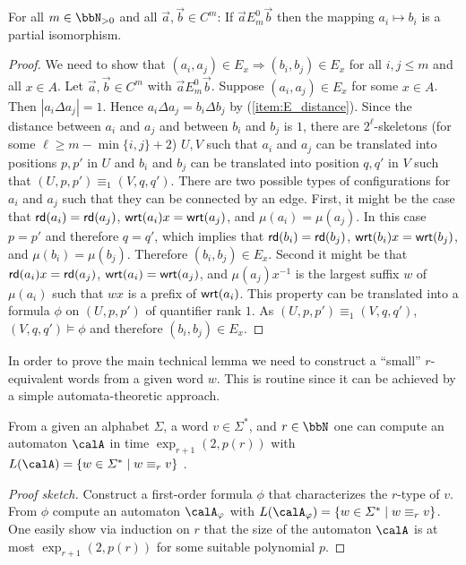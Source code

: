 \begin{lemma}\label{lem:partial_isomorphism}
	For all $m\in\bbN_{>0}$ and all $\vec{a},\vec{b} \in C^m$: If $\vec{a} E^0_m \vec{b}$ then the mapping $a_i \mapsto b_i$ is a partial isomorphism.
\end{lemma}
\begin{proof}
	We need to show that $(a_i,a_j)\in E_x \Rightarrow (b_i,b_j)\in E_x$  for all $i,j\leq m$ and all $x\in A$.
	Let $\vec{a}, \vec{b} \in C^m$ with $\vec{a} E^0_m \vec{b}$. Suppose  $(a_i,a_j) \in E_x$ for some $x\in A$. Then $|a_i\Delta a_j| = 1$. Hence $a_i\Delta a_j = b_i\Delta b_j$ by (\ref{item:E_distance}). 
	Since the distance between $a_i$ and $a_j$ and between $b_i$ and $b_j$ is $1$, there are $2^\ell$-skeletons (for some $\ell \geq m-\min\{i,j\}+2$) $U,V$ such that 
	$a_i$ and $a_j$ can be translated into positions $p, p'$ in $U$ and  $b_i$ and $b_j$ can be translated into position $q, q'$ in $V$ such that $(U,p,p') \equiv_1 (V,q,q')$. 
	There are two possible types of configurations for $a_i$ and $a_j$ such that they can be connected by an edge. First, it might be the case  that $\mathsf{rd}(a_i) = \mathsf{rd}(a_j)$,
	$\mathsf{wrt}(a_i)x = \mathsf{wrt}(a_j)$, and $\mu(a_i) = \mu(a_j)$. In this case $p=p'$ and therefore $q=q'$, which implies that $\mathsf{rd}(b_i) = \mathsf{rd}(b_j)$,
	$\mathsf{wrt}(b_i)x = \mathsf{wrt}(b_j)$, and $\mu(b_i) = \mu(b_j)$. Therefore $(b_i,b_j) \in E_x$.
	Second  it might be that $\mathsf{rd}(a_i)x = \mathsf{rd}(a_j)$,
	$\mathsf{wrt}(a_i) = \mathsf{wrt}(a_j)$, and $\mu(a_j)x^{-1}$ is the largest suffix $w$ of $\mu(a_i)$ such that $wx$ is a prefix of $\mathsf{wrt}(a_i)$.  This property can be translated into a formula $\phi$
	on $(U, p, p')$ of quantifier rank $1$. As $(U,p,p') \equiv_1 (V, q,q')$, $(V,q,q') \models \phi$ and therefore $(b_i,b_j)\in E_x$. 
\end{proof}

In order to prove the main technical lemma we need to construct a ``small'' $r$-equivalent words from a given word $w$. This is routine since it can be achieved by a simple automata-theoretic approach. 
\begin{lemma}\label{lem:r-equiv_word_construction}
	From a given an alphabet $\Sigma$, a word $v\in\Sigma^\ast$, and $r\in\bbN$ one can compute an automaton $\calA$ in time $\exp_{r+1}(2, p(r))$ with $L(\calA) = \{w\in \Sigma^\ast\mid w\equiv_r v \}$ .  
\end{lemma}
\begin{proof}[Proof sketch]
	Construct a first-order formula $\phi$ that characterizes the $r$-type of $v$. From $\phi$ compute an automaton $\calA_\phi$ with $L(\calA_\phi) = \{ w\in\Sigma^\ast \mid w\equiv_r v \}$. One easily show via induction on $r$ that the size of the automaton $\calA$ is at most
	$\exp_{r+1}(2, p(r))$ for some suitable polynomial $p$.
\end{proof}



